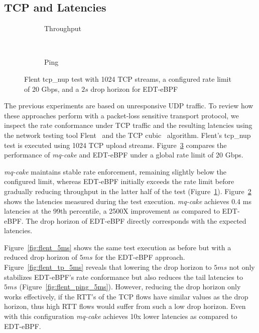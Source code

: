 \subsection{TCP and Latencies}
\begin{figure}
    \centering
    \hspace{-0.25cm}
    \begin{subfigure}{\linewidth}
        \centering
        
        \caption{Throughput}\label{fig:flent_tp_2s}
    \end{subfigure}
    \\
    \begin{subfigure}{\linewidth}
        \centering
        
        \caption{Ping}\label{fig:flent_ping_2s}
    \end{subfigure}
    \caption{Flent tcp\_nup test with 1024 TCP streams, a configured rate limit of 20 Gbps, and a $2s$ drop horizon for EDT-eBPF}\label{fig:flent_2s}
\end{figure}

The previous experiments are based on unresponsive UDP traffic.
To review how these approaches perform with a packet-loss sensitive transport protocol, we inspect the rate conformance under TCP traffic and the resulting latencies using the network testing tool Flent~\cite{flent} and the TCP cubic~\cite{tcp-cubic} algorithm.
%
Flent's tcp\_nup test is executed using 1024 TCP upload streams.
%
Figure~\ref{fig:flent_2s} compares the performance of \textit{mq-cake} and EDT-eBPF under a global rate limit of 20 Gbps.

\textit{mq-cake} maintains stable rate enforcement, remaining slightly below the configured limit, whereas EDT-eBPF initially exceeds the rate limit before gradually reducing throughput in the latter half of the test (Figure~\ref{fig:flent_tp_2s}).
%
Figure~\ref{fig:flent_ping_2s} shows the latencies measured during the test execution. \textit{mq-cake} achieves 0.4 ms latencies at the 99th percentile, a 2500X improvement as compared to EDT-eBPF.
%
The drop horizon of EDT-eBPF directly corresponds with the expected latencies.
%

Figure~\ref{fig:flent_5ms} shows the same test execution as before but with a reduced drop horizon of $5ms$ for the EDT-eBPF approach. Figure~\ref{fig:flent_tp_5ms} reveals that lowering the drop horizon to $5ms$ not only stabilizes EDT-eBPF's rate conformance but also reduces the tail latencies to $5ms$ (Figure~\ref{fig:flent_ping_5ms}).
%
However, reducing the drop horizon only works effectively, if the RTT's of the TCP flows have similar values as the drop horizon, thus high RTT flows would suffer from such a low drop horizon.
Even with this configuration \textit{mq-cake} achieves 10x lower latencies as compared to EDT-eBPF. 

